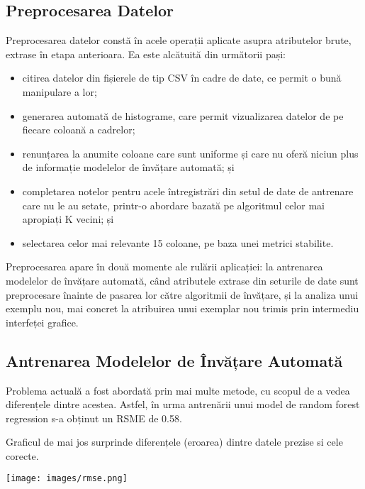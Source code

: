 \documentclass{article}
\begin{document}
\subsection{Preprocesarea Datelor}

Preprocesarea datelor constă în acele operații aplicate asupra atributelor brute, extrase în etapa anterioara. Ea este alcătuită din următorii pași:
\begin{itemize}
    \item citirea datelor din fișierele de tip CSV în cadre de date, ce permit o bună manipulare a lor;
    \item generarea automată de histograme, care permit vizualizarea datelor de pe fiecare coloană a cadrelor;
    \item renunțarea la anumite coloane care sunt uniforme și care nu oferă niciun plus de informație modelelor de învățare automată; și
    \item completarea notelor pentru acele întregistrări din setul de date de antrenare care nu le au setate, printr-o abordare bazată pe algoritmul celor mai apropiați K vecini; și
    \item selectarea celor mai relevante 15 coloane, pe baza unei metrici stabilite.
\end{itemize}

Preprocesarea apare în două momente ale rulării aplicației: la antrenarea modelelor de învățare automată, când atributele extrase din seturile de date sunt preprocesare înainte de pasarea lor către algoritmii de învățare, și la analiza unui exemplu nou, mai concret la atribuirea unui exemplar nou trimis prin intermediu interfeței grafice.

\subsection{Antrenarea Modelelor de Învățare Automată}

Problema actuală a fost abordată prin mai multe metode, cu scopul de a vedea diferențele dintre acestea. Astfel, în urma antrenării unui model de random forest regression s-a obținut un RSME de 0.58.

Graficul de mai jos surprinde diferențele (eroarea) dintre datele prezise si cele corecte.

\vspace{0.3cm}
\begin{center}
    \texttt{[image: images/rmse.png]}
    \label{fig:1}
    \captionsetup{justification=centering,margin=1cm}
\end{center}
\vspace{0.3cm}
\end{document}
